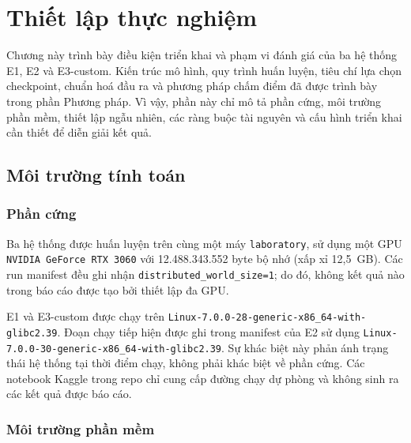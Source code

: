 
\section{Thiết lập thực nghiệm}

Chương này trình bày điều kiện triển khai và phạm vi đánh giá của ba hệ thống
E1, E2 và E3-custom. Kiến trúc mô hình, quy trình huấn luyện, tiêu chí lựa chọn
checkpoint, chuẩn hoá đầu ra và phương pháp chấm điểm đã được trình bày trong
phần Phương pháp. Vì vậy, phần này chỉ mô tả phần cứng, môi trường phần mềm,
thiết lập ngẫu nhiên, các ràng buộc tài nguyên và cấu hình triển khai cần thiết
để diễn giải kết quả.

\subsection{Môi trường tính toán}

\subsubsection{Phần cứng}

Ba hệ thống được huấn luyện trên cùng một máy \texttt{laboratory}, sử dụng một
GPU \texttt{NVIDIA GeForce RTX 3060} với 12.488.343.552 byte bộ nhớ (xấp xỉ
12,5~GB). Các run manifest đều ghi nhận
\texttt{distributed\_world\_size=1}; do đó, không kết quả nào trong báo cáo
được tạo bởi thiết lập đa GPU.

E1 và E3-custom được chạy trên
\texttt{Linux-7.0.0-28-generic-x86\_64-with-glibc2.39}. Đoạn chạy tiếp hiện được
ghi trong manifest của E2 sử dụng
\texttt{Linux-7.0.0-30-generic-x86\_64-with-glibc2.39}. Sự khác biệt này phản
ánh trạng thái hệ thống tại thời điểm chạy, không phải khác biệt về phần cứng.
Các notebook Kaggle trong repo chỉ cung cấp đường chạy dự phòng và không sinh
ra các kết quả được báo cáo.

\subsubsection{Môi trường phần mềm}

